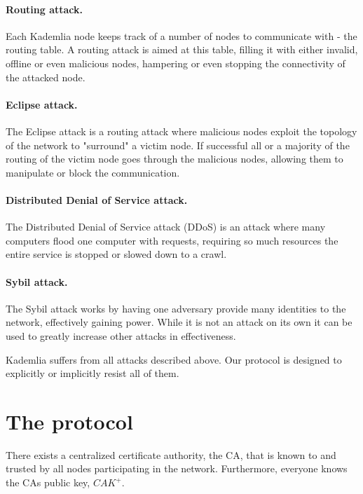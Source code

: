 \documentclass[12pt]{article}
\begin{document}
\paragraph{Routing attack.} Each Kademlia node keeps track of a number of nodes
to communicate with - the routing table. A routing attack is aimed at this
table, filling it with either invalid, offline or even malicious nodes,
hampering or even stopping the connectivity of the attacked node.

\paragraph{Eclipse attack.} The Eclipse attack \cite{singh2006eclipse} is a
routing attack where malicious nodes exploit the topology of the network to
"surround" a victim node. If successful all or a majority of the routing of the
victim node goes through the malicious nodes, allowing them to manipulate or
block the communication.

\paragraph{Distributed Denial of Service attack.} The Distributed Denial of
Service attack (DDoS) is an attack where many computers flood one computer with
requests, requiring so much resources the entire service is stopped or slowed
down to a crawl.

\paragraph{Sybil attack.} The Sybil attack \cite{douceur2002sybil} works by
having one adversary provide many identities to the network, effectively
gaining power. While it is not an attack on its own it can be used to greatly
increase other attacks in effectiveness.

Kademlia suffers from all attacks described above. Our protocol is designed
to explicitly or implicitly resist all of them.


 
\section{The protocol}

There exists a centralized certificate authority, the
CA, that is known to and trusted by all nodes participating in the network.
Furthermore, everyone knows the CAs public key, $CAK^+$.
\end{document}
